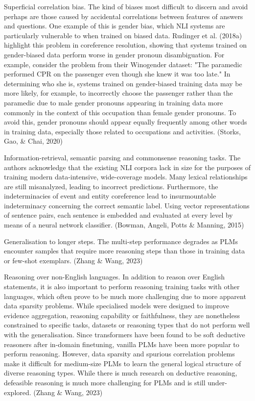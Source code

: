 \documentclass[fleqn,moreauthors,10pt]{ds_report}
\begin{document}
Superficial correlation bias. The kind of biases most difficult to discern and avoid perhaps are those caused by accidental correlations between features of answers and questions. One example of this is gender bias, which NLI systems are particularly vulnerable to when trained on biased data. Rudinger et al. (2018a) highlight this problem in coreference resolution, showing that systems trained on gender-biased data perform worse in gender pronoun disambiguation. For example, consider the problem from their Winogender dataset: "The paramedic performed CPR on the passenger even though she knew it was too late." In determining who she is, systems trained on gender-biased training data may be more likely, for example, to incorrectly choose the passenger rather than the paramedic due to male gender pronouns appearing in training data more commonly in the context of this occupation than female gender pronouns. To avoid this, gender pronouns should appear equally frequently among other words in training data, especially those related to occupations and activities. (Storks, Gao, \& Chai, 2020)

Information-retrieval, semantic parsing and commonsense reasoning tasks. The authors acknowledge that the existing NLI corpora lack in size for the purposes of training modern data-intensive, wide-coverage models. Many lexical relationships are still misanalyzed, leading to incorrect predictions. Furthermore, the indeterminacies of event and entity coreference lead to insurmountable indeterminacy concerning the correct semantic label. Using vector representations of sentence pairs, each sentence is embedded and evaluated at every level by means of a neural network classifier. (Bowman, Angeli, Potts \& Manning, 2015)

Generalisation to longer steps. The multi-step performance degrades as PLMs encounter samples that require more reasoning steps than those in training data or few-shot exemplars. (Zhang \& Wang, 2023)

Reasoning over non-English languages. In addition to reason over English statements, it is also important to perform reasoning training tasks with other languages, which often prove to be much more challenging due to more apparent data sparsity problems. While specialised models were designed to improve evidence aggregation, reasoning capability or faithfulness, they are nonetheless constrained to specific tasks, datasets or reasoning types that do not perform well with  the generalisation. Since transformers have been found to be soft deductive reasoners after in-domain finetuning, vanilla PLMs have been more popular to perform reasoning. However, data sparsity and spurious correlation problems make it difficult for medium-size PLMs to learn the general logical structure of diverse reasoning types. While there is much research on deductive reasoning, defeasible reasoning is much more challenging for PLMs and is still under-explored. (Zhang \& Wang, 2023)
\end{document}
